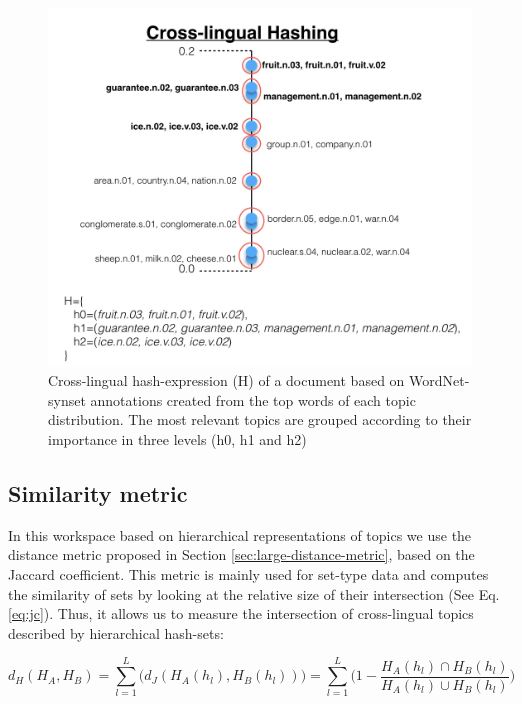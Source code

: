 \begin{figure}[!htbp]\centering
\includegraphics[scale=0.35]{density-hash.png}
\caption{Cross-lingual hash-expression (H) of a document based on WordNet-synset annotations created from the top words of each topic distribution. The most relevant topics are grouped according to their importance in three levels (h0, h1 and h2)}
\label{fig:density_hash2}
\end{figure}


\subsection{Similarity metric}
\label{sec:cl-sim-metric}
In this workspace based on hierarchical representations of topics we use the distance metric proposed in Section \ref{sec:large-distance-metric}, based on the Jaccard coefficient. This metric is mainly used for set-type data \citep{Li2012, Ji2013, Li2010b, Zhao2013} and computes the similarity of sets by looking at the relative size of their intersection (See Eq. \ref{eq:jc}). Thus, it allows us to measure the intersection of cross-lingual topics described by hierarchical hash-sets:

\begin{equation}
d_H(H_A,H_B) = \sum\limits_{l=1}^L \Big( d_J(H_A(h_l),H_B(h_l)) \Big) = 
\sum\limits_{l=1}^L \Big( 1 - \frac{H_A(h_l) \cap H_B(h_l)}{H_A(h_l) \cup H_B(h_l)} \Big) 
\label{eq:dh2}
\end{equation}

